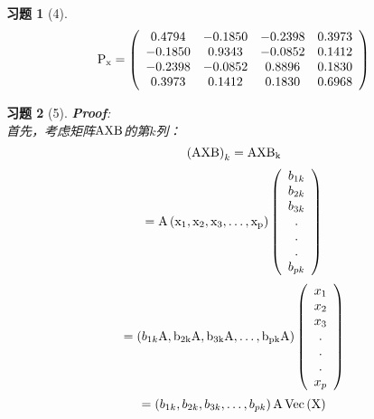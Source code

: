 \documentclass[12pt, oneside]{article}
\newtheorem*{exercise}{\textbf{习题}}
\begin{document}
\begin{exercise}[4]
	\scriptsize
	\begin{equation*}
		\rm{
			P_x = \left(
			\begin{array}{cccc}
				0.4794  & -0.1850 & -0.2398 & 0.3973 \\
				-0.1850 & 0.9343  & -0.0852 & 0.1412 \\
				-0.2398 & -0.0852 & 0.8896  & 0.1830 \\
				0.3973  & 0.1412  & 0.1830  & 0.6968 \\
			\end{array}
			\right)
		}
	\end{equation*}
\end{exercise}

\begin{exercise}[5]
	\rm{
		\textbf{Proof}:\\
		首先，考虑矩阵$\rm{AXB}$的第$k$列：
		\begin{equation*}
			\left( \rm{AXB} \right)_k = \rm{AXB}_k
		\end{equation*}
		\begin{equation*}
			= \rm{A} \left( x_1, x_2, x_3, \dots , x_p \right)
			\left(
			\begin{array}{c}
				b_{1k} \\
				b_{2k} \\
				b_{3k} \\
				.      \\
				.      \\
				.      \\
				b_{pk} \\
			\end{array}
			\right)
		\end{equation*}
		\begin{equation*}
			= \left( b_{1k}\rm{A}, b_{2k}\rm{A}, b_{3k}\rm{A}, \dots , b_{pk}\rm{A}\right) \left(
			\begin{array}{c}
				x_1 \\
				x_2 \\
				x_3 \\
				.   \\
				.   \\
				.   \\
				x_p \\
			\end{array}
			\right)
		\end{equation*}
		\begin{equation*}
			= \left( b_{1k}, b_{2k}, b_{3k}, \dots , b_{pk}\right)\rm{A}\operatorname{Vec}\left( \rm{X} \right)

\end{equation*}}
\end{exercise}
\end{document}
